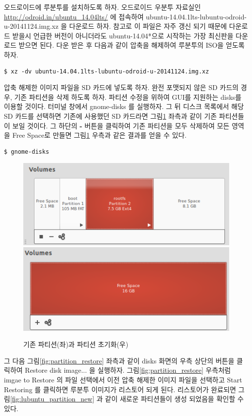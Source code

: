 오드로이드에 루분투를 설치하도록 하자. 오드로이드 우분투 자료실인 \url{http://odroid.in/ubuntu_14.04lts/} 에 접속하여 ubuntu-14.04.1lts-lubuntu-odroid-u-20141124.img.xz 을 다운로드 하자. 참고로 이 파일은 자주 갱신 되기 때문에 다운로드 받을시 언급한 버전이 아니더라도 ubuntu-14.04*으로 시작하는 가장 최신판을 다운로드 받으면 된다. 다운 받은 후 다음과 같이 압축을 해제하여 루분투의 ISO을 얻도록 하자.\\

\begin{lstlisting}[language=ROS]
$ xz -dv ubuntu-14.04.1lts-lubuntu-odroid-u-20141124.img.xz
\end{lstlisting}

압축 해제한 이미지 파일을 SD 카드에 넣도록 하자. 완전 포맷되지 않은 SD 카드의 경우, 기존 파티션을 삭제 하도록 하자. 파티션 수정을 위하여 GUI를 지원하는 disks를 이용할 것이다. 터미널 창에서 gnome-disks 를 실행하자. 그 뒤 디스크 목록에서 해당 SD 카드를 선택하면 기존에 사용했던 SD 카드라면 그림\ref{fig:partition_init2} 좌측과 같이 기존 파티션들이 보일 것이다. 그 하단의 \textbf{-} 버튼을 클릭하여 기존 파티션을 모두 삭제하여 모든 영역을 Free Space로 만들면 그림\ref{fig:partition_init2} 우측과 같은 결과를 얻을 수 있다.

\vspace{\baselineskip}
\begin{lstlisting}[language=ROS]
$ gnome-disks
\end{lstlisting}

\begin{figure}[h]
\centering
\includegraphics[width=0.49\columnwidth]{pictures/chapter3/odroid_partition1.png}
\includegraphics[width=0.48\columnwidth]{pictures/chapter3/odroid_partition2.png}
\caption{기존 파티션(좌)과 파티션 초기화(우)}
\label{fig:partition_init2}
\end{figure}

그 다음 그림\ref{fig:partition_restore} 좌측과 같이 disks 화면의 우측 상단의 버튼을 클릭하여 Restore disk image... 을 실행하자. 그림\ref{fig:partition_restore} 우측처럼 imgae to Restore 의 파일 선택에서 이전 압축 해제한 이미지 파일을 선택하고 Start Restoring 를 클릭하면 루분투 이미지가 리스토어 되게 된다. 리스토어가 완료되면 그림\ref{fig:lubuntu_partition_new} 과 같이 새로운 파티션들이 생성 되었음을 확인할 수 있다.

